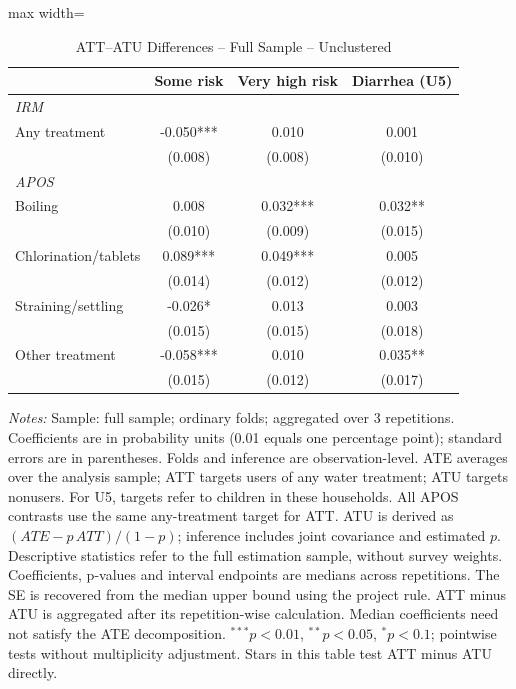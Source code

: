 \begin{table}[htbp]
\centering
\caption{ATT--ATU Differences -- Full Sample -- Unclustered}
\label{tab:ate-att-atu-iid-aggregated-difference}
\scriptsize
\setlength{\tabcolsep}{4pt}
\renewcommand{\arraystretch}{0.92}
\begin{adjustbox}{max width=\linewidth}
\begin{tabular}{lccc}
\hline\hline
 & Some risk & Very high risk & Diarrhea (U5) \\
\midrule
\multicolumn{4}{l}{\textit{IRM}} \\
Any treatment & -0.050*** & 0.010 & 0.001 \\
 & (0.008) & (0.008) & (0.010) \\
\midrule
\multicolumn{4}{l}{\textit{APOS}} \\
Boiling & 0.008 & 0.032*** & 0.032** \\
 & (0.010) & (0.009) & (0.015) \\
Chlorination/tablets & 0.089*** & 0.049*** & 0.005 \\
 & (0.014) & (0.012) & (0.012) \\
Straining/settling & -0.026* & 0.013 & 0.003 \\
 & (0.015) & (0.015) & (0.018) \\
Other treatment & -0.058*** & 0.010 & 0.035** \\
 & (0.015) & (0.012) & (0.017) \\
\hline\hline
\end{tabular}
\end{adjustbox}
\par\vspace{3pt}
\begin{minipage}{\linewidth}\scriptsize \textit{Notes:} Sample: full sample; ordinary folds; aggregated over 3 repetitions. Coefficients are in probability units (0.01 equals one percentage point); standard errors are in parentheses. Folds and inference are observation-level. ATE averages over the analysis sample; ATT targets users of any water treatment; ATU targets nonusers. For U5, targets refer to children in these households. All APOS contrasts use the same any-treatment target for ATT. ATU is derived as $(ATE-p\,ATT)/(1-p)$; inference includes joint covariance and estimated $p$. Descriptive statistics refer to the full estimation sample, without survey weights. Coefficients, p-values and interval endpoints are medians across repetitions. The SE is recovered from the median upper bound using the project rule. ATT minus ATU is aggregated after its repetition-wise calculation. Median coefficients need not satisfy the ATE decomposition. $^{***}p<0.01$, $^{**}p<0.05$, $^{*}p<0.1$; pointwise tests without multiplicity adjustment. Stars in this table test ATT minus ATU directly.\end{minipage}
\end{table}
